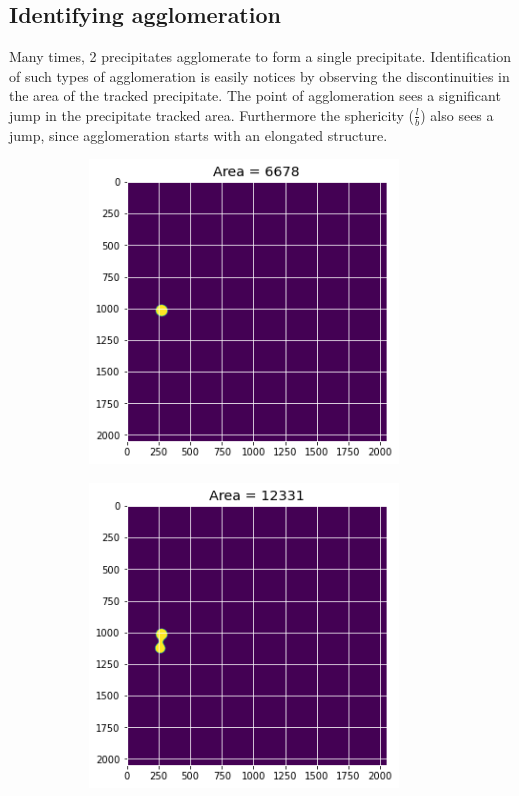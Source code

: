 \documentclass[12pt, a4paper]{report}
\begin{document}
\subsection{Identifying agglomeration}
Many times, 2 precipitates agglomerate to form a single precipitate. Identification of such types of agglomeration is easily notices by observing the discontinuities in the area of the tracked precipitate. The point of agglomeration sees a significant jump in the precipitate tracked area. Furthermore the sphericity ($\frac{l}{b}$) also sees a jump, since agglomeration starts with an elongated structure.
\begin{figure}[H]
\centering
\begin{subfigure}{.24\textwidth}
  \centering
  \includegraphics[width=0.9\textwidth]{Pictures/Growth/2.1.jpeg}
  \label{img:microstrImg}
\end{subfigure}
\begin{subfigure}{.24\textwidth}
  \centering
  \includegraphics[width=0.9\textwidth]{Pictures/Growth/2.2.jpeg}

\end{subfigure}
\end{figure}
\end{document}
